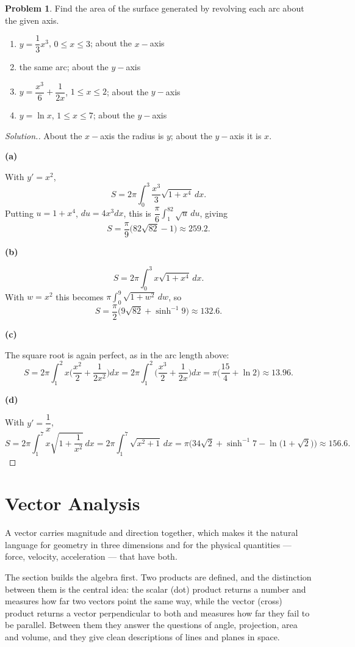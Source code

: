 \documentclass[11pt,a4paper]{article}
\theoremstyle{definition}
\newtheorem{problemx}{Problem}[subsection]
\newenvironment{problem}{\begin{problemx}}{\end{problemx}}
\newenvironment{solution}
  {\renewcommand{\qedsymbol}{}\begin{proof}[\textit{Solution}.]}
  {\end{proof}}
\newcommand{\subhead}[1]{%
  \par\medskip\noindent\textbf{#1}\par\nobreak\smallskip}
\begin{document}
\begin{problem}
Find the area of the surface generated by revolving each arc about the given
axis.
\begin{enumerate}
\item[(a)] $y = \dfrac13x^3$, $0\leq x\leq 3$; about the $x-$axis
\item[(b)] the same arc; about the $y-$axis
\item[(c)] $y = \dfrac{x^3}{6} + \dfrac{1}{2x}$, $1\leq x\leq 2$; about the
$y-$axis
\item[(d)] $y = \ln x$, $1\leq x\leq 7$; about the $y-$axis
\end{enumerate}
\end{problem}
\begin{solution}
About the $x-$axis the radius is $y$; about the $y-$axis it is $x$.

\subhead{(a)} With $y' = x^2$,
$$S = 2\pi\int_0^3\frac{x^3}{3}\sqrt{1+x^4}\,dx .$$
Putting $u = 1+x^4$, $du = 4x^3dx$, this is
$\dfrac{\pi}{6}\displaystyle\int_1^{82}\sqrt u\,du$, giving
$$S = \frac{\pi}{9}\Big(82\sqrt{82}-1\Big)\approx 259.2 .$$

\subhead{(b)}
$$S = 2\pi\int_0^3x\sqrt{1+x^4}\,dx .$$
With $w = x^2$ this becomes $\pi\displaystyle\int_0^9\sqrt{1+w^2}\,dw$, so
$$S = \frac{\pi}{2}\Big(9\sqrt{82} + \sinh^{-1}9\Big)\approx 132.6 .$$

\subhead{(c)} The square root is again perfect, as in the arc length above:
$$S = 2\pi\int_1^2x\Big(\frac{x^2}{2}+\frac{1}{2x^2}\Big)dx
= 2\pi\int_1^2\Big(\frac{x^3}{2}+\frac{1}{2x}\Big)dx
= \pi\Big(\frac{15}{4} + \ln 2\Big)\approx 13.96 .$$

\subhead{(d)} With $y' = \dfrac1x$,
$$S = 2\pi\int_1^7x\sqrt{1+\frac{1}{x^2}}\,dx
= 2\pi\int_1^7\sqrt{x^2+1}\,dx
= \pi\Big(34\sqrt2 + \sinh^{-1}7 - \ln\big(1+\sqrt2\big)\Big)\approx 156.6 .$$
\end{solution}




\section{Vector Analysis}

A vector carries magnitude and direction together, which makes it the natural
language for geometry in three dimensions and for the physical quantities ---
force, velocity, acceleration --- that have both.

The section builds the algebra first. Two products are defined, and the
distinction between them is the central idea: the scalar (dot) product returns a
number and measures how far two vectors point the same way, while the vector
(cross) product returns a vector perpendicular to both and measures how far they
fail to be parallel. Between them they answer the questions of angle, projection,
area and volume, and they give clean descriptions of lines and planes in space.
\end{document}
